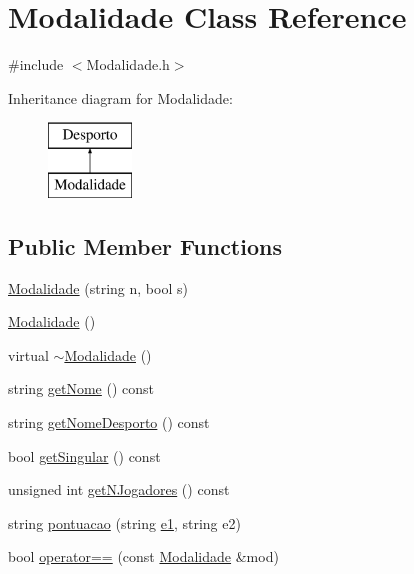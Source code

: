 \hypertarget{class_modalidade}{}\section{Modalidade Class Reference}
\label{class_modalidade}


{\ttfamily \#include $<$Modalidade.\+h$>$}

Inheritance diagram for Modalidade\+:\begin{figure}[H]
\begin{center}
\leavevmode
\includegraphics[height=2.000000cm]{class_modalidade}
\end{center}
\end{figure}
\subsection*{Public Member Functions}
\begin{DoxyCompactItemize}
\item 
\hyperlink{class_modalidade_a7d4201d3b89eb76cc5d147b642d32e72}{Modalidade} (string n, bool s)
\item 
\hyperlink{class_modalidade_aa60765d8148536471b4429e48858f883}{Modalidade} ()
\item 
virtual \hyperlink{class_modalidade_aea7526674a2128f030f58b8eff7c64bd}{$\sim$\+Modalidade} ()
\item 
string \hyperlink{class_modalidade_a46003f6a0dceac894f92971a6df9e4a7}{get\+Nome} () const 
\item 
string \hyperlink{class_modalidade_ac3326eec4d00a080b289ca249aa90cb7}{get\+Nome\+Desporto} () const 
\item 
bool \hyperlink{class_modalidade_acd8247f33c0aacef9388a2e452c06a19}{get\+Singular} () const 
\item 
unsigned int \hyperlink{class_modalidade_ae9016743d83bb1bd83ae1c076db5e65c}{get\+N\+Jogadores} () const 
\item 
string \hyperlink{class_modalidade_af7a45f3b8d73d45fd5cac46939344071}{pontuacao} (string \hyperlink{main_8h_a94bd6f24df224a4dd936a7dba7521ff0}{e1}, string e2)
\item 
bool \hyperlink{class_modalidade_a9f95f0d277728324be424570d69fc653}{operator==} (const \hyperlink{class_modalidade}{Modalidade} \&mod)
\end{DoxyCompactItemize}
